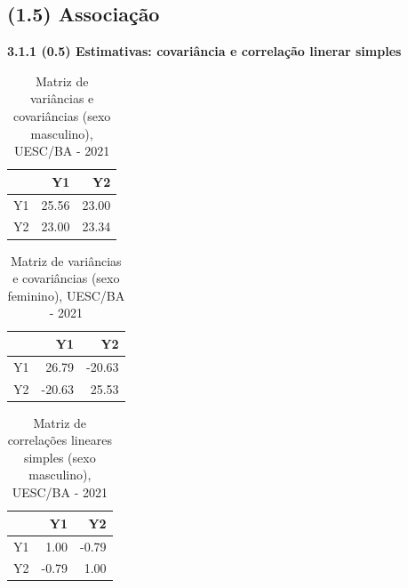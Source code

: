 \documentclass[12pt]{article}\usepackage[]{graphicx}\usepackage[]{color}
\begin{document}
 \subsection{(1.5) Associação}

  \textbf{3.1.1 (0.5) Estimativas: covariância e correlação linerar simples }
  

\begin{table}[!ht]
    \centering
    \caption{Matriz de variâncias e covariâncias (sexo masculino), UESC/BA - 2021}
    \begin{tabular}{rrr}
    \hline
    & Y1 & Y2 \\ 
    \hline
    Y1 & 25.56 & 23.00 \\ 
    Y2 & 23.00 & 23.34 \\ 
     \hline
  \end{tabular}
\end{table}

\begin{table}[!ht]
   \centering
   \caption{Matriz de variâncias e covariâncias (sexo feminino), UESC/BA - 2021}
   \begin{tabular}{rrr}
   \hline
  & Y1 & Y2\\ 
  \hline
  Y1 & 26.79 & -20.63 \\ 
  Y2 & -20.63 & 25.53 \\ 
   \hline
\end{tabular}
\end{table}

\begin{table}[!ht]
   \centering
   \caption{Matriz de correlações lineares simples (sexo masculino), UESC/BA - 2021}
   \begin{tabular}{rrr}
   \hline
  & Y1 & Y2\\ 
  \hline
  Y1 & 1.00 & -0.79 \\ 
  Y2 & -0.79 & 1.00 \\
  \hline
  \end{tabular}
\end{table}
\end{document}
